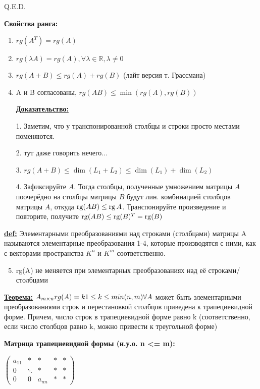 \hfill Q.E.D.

\textbf{Свойства ранга:}
\begin{enumerate}
    \item $ rg(A^T) = rg(A) $
    \item $ rg(\lambda A) = rg(A), \forall \lambda \in \mathbb{R},  \lambda \ne 0 $
    \item $ rg(A+B) \leq rg(A)+rg(B) $ (лайт версия т. Грассмана)
    \item A и B согласованы, $ rg(AB) \leq \min(rg(A),rg(B)) $
\end{enumerate}
\begin{enumerate}
    \item[] \textbf{\uline{Доказательство:}}
    \item[1.] Заметим, что у транспонированной столбцы и строки просто местами поменяются.
    \item[2.] тут даже говорить нечего...
    \item[3.] $rg(A+B) \leq \dim(L_1 + L_2) \leq \dim(L_1) +\dim(L_2)$
    \item[4.] Зафиксируйте $A$. Тогда столбцы, полученные умножением матрицы $A$ поочерёдно на столбцы матрицы $B$ будут лин. комбинацией столбцов матрицы $A$, откуда $\operatorname{rg} (AB)\leq\operatorname{rg} A$. Транспонируйте произведение и повторите, получите $\operatorname{rg} (AB)\leq\operatorname{rg} (B)^T = \operatorname{rg}(B)$
\end{enumerate}

\textbf{\underline{def:}} Элементарными преобразованиями над строками (столбцами) матрицы A называются элементарные преобразования 1-4, которые производятся с ними, как с векторами пространства $K^n$ и $K^m$ соответственно.

\begin{enumerate}
    \setcounter{enumi}{4}
    \item rg(A) не меняется при элементарных преобразованиях над её строками/столбцами
\end{enumerate}

\textbf{\underline{Теорема:}}
\( A_{m \times n} \newline
rg(A) = k \newline
1 \leq k \leq min(n, m) \newline
\forall A\) может быть элементарными преобразованиями строк и перестановкой столбцов приведена к трапециевидной форме. Причем, число строк в трапециевидной форме равно k (соответственно, если число столбцов равно k, можно привести к треугольной форме)

\textbf{Матрица трапециевидной формы (н.у.о. n <= m):}

\(
\begin{pmatrix}
    a_{11} & *      & *      & * & * \\
    0      & \ddots & *      & * & * \\
    0      & 0      & a_{nn} & * & *
\end{pmatrix}
\) %

